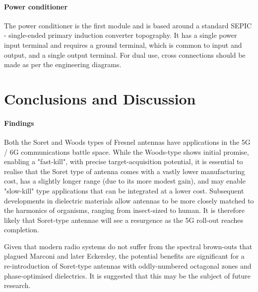 \documentclass[review]{elsarticle}
\begin{document}
\paragraph{Power conditioner} The power conditioner is the first module and is based around a standard SEPIC - single-ended primary induction converter topography. It has a single power input terminal and requires a ground terminal, which is common to input and output, and a single output terminal. For dual use, cross connections should be made as per the engineering diagrams.

\section{Conclusions and Discussion}
\paragraph{Findings}
Both the Soret and Woods types of Fresnel antennas have applications in the 5G / 6G communications battle space. While the Woods-type shows initial promise, enabling a "fast-kill", with precise target-acquisition potential, it is essential to realise that the Soret type of antenna comes with a vastly lower manufacturing cost, has a slightly longer range (due to its more modest gain), and may enable "slow-kill" type applications that can be integrated at a lower cost. Subsequent developments in dielectric materials allow antennas to be more closely matched to the harmonics of organisms, ranging from insect-sized to human. It is therefore likely that Soret-type antennae will see a resurgence as the 5G roll-out reaches completion. 

Given that modern radio systems do not suffer from the spectral brown-outs that plagued Marconi and later Eckersley, the potential benefits are significant for a re-introduction of Soret-type antennas with oddly-numbered octagonal zones and phase-optimised dielectrics. It is suggested that this may be the subject of future research.


\end{document}
